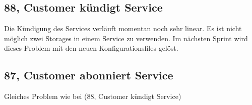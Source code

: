 \subsection{88, Customer kündigt Service}
Die Kündigung des Services verläuft momentan noch sehr linear. Es ist nicht möglich zwei Storages in einem Service zu verwenden. Im nächsten Sprint wird dieses Problem mit den neuen Konfigurationsfiles gelöst.\\

\subsection{87, Customer abonniert Service}
Gleiches Problem wie bei (88, Customer kündigt Service)\\

